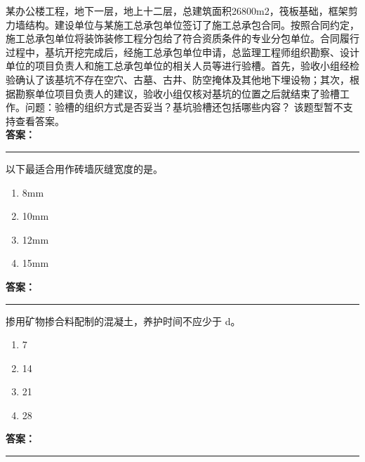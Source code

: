 \documentclass[UTF8,fontset=fandol,11pt]{ctexart}
\newcommand{\answerline}{\textcolor{answerred}{\rule{2.4cm}{0.7pt}}}
\begin{document}
\vspace{0.2em}

\begin{quizbox}[title={乱序第 254 题｜第一章土方工程}]

某办公楼工程，地下一层，地上十二层，总建筑面积26800m2，筏板基础，框架剪力墙结构。建设单位与某施工总承包单位签订了施工总承包合同。按照合同约定，施工总承包单位将装饰装修工程分包给了符合资质条件的专业分包单位。合同履行过程中，基坑开挖完成后，经施工总承包单位申请，总监理工程师组织勘察、设计单位的项目负责人和施工总承包单位的相关人员等进行验槽。首先，验收小组经检验确认了该基坑不存在空穴、古墓、古井、防空掩体及其他地下埋设物；其次，根据勘察单位项目负责人的建议，验收小组仅核对基坑的位置之后就结束了验槽工作。问题：验槽的组织方式是否妥当？基坑验槽还包括哪些内容？ 该题型暂不支持查看答案。\\

\textbf{\textcolor{answerred}{答案：}} \answerline

\end{quizbox}

\vspace{0.2em}

\begin{quizbox}[title={乱序第 255 题｜第六章砌筑工程}]

以下最适合用作砖墙灰缝宽度的是。\\

\begin{enumerate}[label=\Alph*.]

\item 8mm

\item 10mm

\item 12mm

\item 15mm

\end{enumerate}

\textbf{\textcolor{answerred}{答案：}} \answerline

\end{quizbox}

\vspace{0.2em}

\begin{quizbox}[title={乱序第 256 题｜第四章混凝土结构工程}]

掺用矿物掺合料配制的混凝土，养护时间不应少于 d。\\

\begin{enumerate}[label=\Alph*.]

\item 7

\item 14

\item 21

\item 28

\end{enumerate}

\textbf{\textcolor{answerred}{答案：}} \answerline

\end{quizbox}
\end{document}
